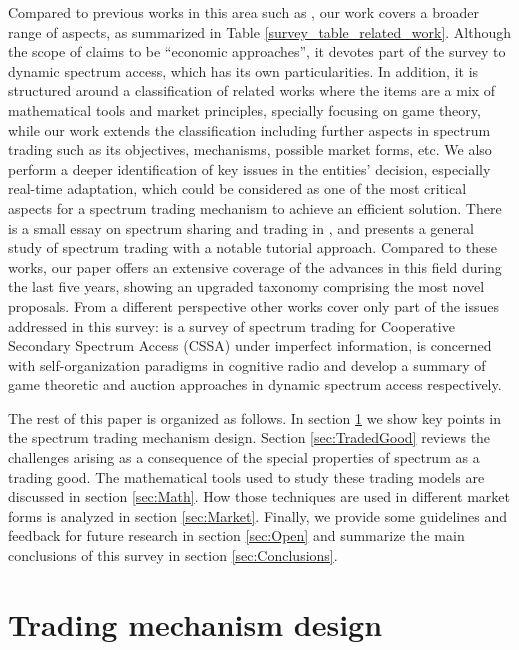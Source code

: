 Compared to previous works in this area such as \cite{ref:Maharjan2011,ref:Niyato2008_Spec,ref:Hossain2009,ref:Huang2013,ref:Zhang2013,ref:Akkara2011,ref:Zhang2012}, our work covers a broader range of aspects, as summarized in Table \ref{survey_table_related_work}.
Although the scope of \cite{ref:Maharjan2011} claims to be ``economic approaches'', it devotes part of the survey to dynamic spectrum access, which has its own particularities. 
In addition, it is structured around a classification of related works where the items are a mix of mathematical tools and market principles, specially focusing on game theory, while our work extends the classification including further aspects in spectrum trading such as its objectives, mechanisms, possible market forms, etc. 
We also perform a deeper identification of key issues in the entities' decision, especially real-time adaptation, which could be considered as one of the most critical aspects for a spectrum trading mechanism to achieve an efficient solution. 
There is a small essay on spectrum sharing and trading in \cite{ref:Niyato2008_Spec}, and \cite{ref:Hossain2009} presents a general study of spectrum trading with a notable tutorial approach. 
Compared to these works, our paper offers an extensive coverage of the advances in this field during the last five years, showing an upgraded taxonomy comprising the most novel proposals. 
From a different perspective other works cover only part of the issues addressed in this survey: \cite{ref:Huang2013} is a survey of spectrum trading for Cooperative Secondary Spectrum Access (CSSA) under imperfect information, \cite{ref:Zhang2013} is concerned with self-organization paradigms in cognitive radio and \cite{ref:Akkara2011,ref:Zhang2012} develop a summary of game theoretic and auction approaches in dynamic spectrum access respectively. 

The rest of this paper is organized as follows. In section \ref{sec:Trading} we show key points in the spectrum trading mechanism design. Section \ref{sec:TradedGood} reviews the challenges arising as a consequence of the special properties of spectrum as a trading good. The mathematical tools used to study these trading models are discussed in section \ref{sec:Math}. How those techniques are used in different market forms is analyzed in section \ref{sec:Market}. Finally, we provide some guidelines and feedback for future research in section \ref{sec:Open} and summarize the main conclusions of this survey in section \ref{sec:Conclusions}.

\section{Trading mechanism design} 
\label{sec:Trading}
